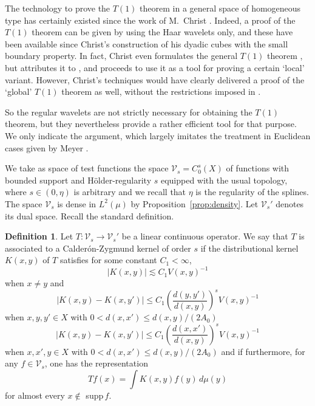 \documentclass{amsart}
\numberwithin{equation}{section}
\theoremstyle{plain}
\theoremstyle{definition}
\newtheorem{definition}[equation]{Definition}
\theoremstyle{remark}
\begin{document}
{{{{The technology to prove the $T(1)$ theorem in a general space of homogeneous type has certainly existed since the work of M.~Christ \cite{Christ}.
Indeed, a proof of the $T(1)$ theorem can be given by using the Haar wavelets only, and these have been available since Christ's construction of his dyadic cubes with the small boundary property. In fact, Christ even formulates the general $T(1)$ theorem \cite[Theorem 8]{Christ}, but attributes it to \cite{DJS}, and proceeds to use it as a tool for proving a certain `local' variant. However, Christ's techniques would have clearly delivered a proof of the `global' $T(1)$ theorem as well, without the restrictions imposed in \cite{DJS}.

So the regular wavelets are not strictly necessary for obtaining the $T(1)$ theorem, but they nevertheless provide a rather efficient tool for that purpose. We only indicate the argument, which largely imitates the treatment in Euclidean cases given by Meyer \cite{M2}.
}

 

 
We take as space of test functions the space
 $\mathcal{V}_{s}= C^s_{0}(X)$ of functions with bounded support and  H\"older-regularity $s$ equipped with the usual topology, where $s\in (0,\eta)$ is arbitrary and we recall that $\eta$ is the regularity of the splines.  The space $\mathcal{V}_{s}$ is dense in $L^2(\mu)$ by Proposition~\ref{prop:density}.  Let $\mathcal{V}_{s}'$ denotes its dual space.  Recall the standard definition. 
 
\begin{definition}\label{def:CZK}
Let $T:\mathcal{V}_{s}\to \mathcal{V}_{s}'$ be a linear continuous operator. We say that $T$ is associated to a Calder\'on-Zygmund kernel of order $s$ if the  distributional kernel $K(x,y)$ of $T$ satisfies for some constant $C_{1}<\infty$,
$$
 |K(x,y)| \lesssim C_{1 }V(x,y)^{-1}
 $$
 when $x\ne y$ and $$
 |K(x,y)-K(x,y')|\le   C_{1}\left( \frac{d(y,y')}{d(x,y)}\right)^s  V(x,y)^{-1}
   $$
   when $x,y,y' \in X$ with $0<d(x,x') \le d(x,y)/(2A_{0})$
   $$
  |K(x,y)-K(x,y')|\le    C_{1}\left( \frac{d(x,x')}{d(x,y)}\right)^s  V(x,y)^{-1}$$
  when $x,x',y \in X$ with $0< d(x,x') \le d(x,y)/(2A_{0})$ and if furthermore, 
 for any $f \in \mathcal{V}_{s}$,  one has the representation 
  \begin{equation}
\label{eq:rep}
Tf(x)= \int K(x,y)f(y)\, d\mu(y)
\end{equation}
 for almost every $x\notin $ supp$\, f$. 
\end{definition} 

}}}
\end{document}
